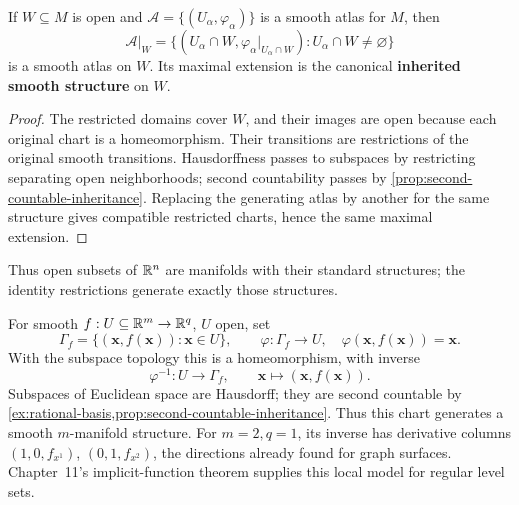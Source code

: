 \begin{proposition}
\label{prop:inherited-smooth-structure}
If $W\subseteq M$ is open and $\mathcal A=\{(U_\alpha,\varphi_\alpha)\}$
is a smooth atlas for $M$, then
\[
\mathcal A|_W=\{(U_\alpha\cap W,\varphi_\alpha|_{U_\alpha\cap W}):
U_\alpha\cap W\ne\varnothing\}
\]
is a smooth atlas on $W$. Its maximal extension is the canonical
\textbf{inherited smooth structure} on $W$.
\end{proposition}
\begin{proof}
The restricted domains cover $W$, and their images are open because each
original chart is a homeomorphism. Their transitions are restrictions of
the original smooth transitions. Hausdorffness passes to subspaces by
restricting separating open neighborhoods; second countability passes by
\cref{prop:second-countable-inheritance}. Replacing the generating atlas by another for the same
structure gives compatible restricted charts, hence the same maximal extension.
\end{proof}
Thus open subsets of $\mathbb{R}^n$ are manifolds with their standard structures;
the identity restrictions generate exactly those structures.

\begin{example}
For smooth $f:U\subseteq\mathbb{R}^m\to\mathbb{R}^q$, $U$ open, set
\[
\Gamma_f=\{(\mathbf{x},f(\mathbf{x})):\mathbf{x}\in U\},\qquad
\varphi:\Gamma_f\to U,\quad\varphi(\mathbf{x},f(\mathbf{x}))=\mathbf{x}.
\]
With the subspace topology this is a homeomorphism, with inverse
\[
\varphi^{-1}:U\to\Gamma_f,\qquad \mathbf{x}\mapsto(\mathbf{x},f(\mathbf{x})).
\]
Subspaces of Euclidean space are Hausdorff; they are second countable by
\cref{ex:rational-basis,prop:second-countable-inheritance}. Thus this
chart generates a smooth $m$-manifold structure. For $m=2,q=1$, its inverse
has derivative columns $(1,0,f_{x^1})$, $(0,1,f_{x^2})$, the directions
already found for graph surfaces. Chapter~11's implicit-function theorem
supplies this local model for regular level sets.
\end{example}

